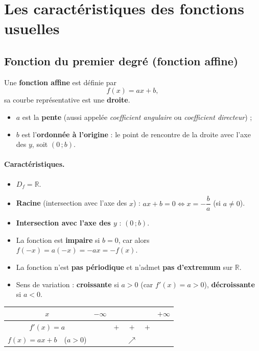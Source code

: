 \documentclass[11pt,a4paper]{article}
\newcommand{\R}{\mathbb{R}}
\newcommand{\Df}{D_f}
\newcommand{\croit}{\textcolor{varcol}{\Large$\nearrow$}}
\begin{document}
\section{Les caractéristiques des fonctions usuelles}

\subsection{Fonction du premier degré (fonction affine)}

\begin{definition}
Une \textbf{fonction affine} est définie par
\[
  f(x)=ax+b ,
\]
sa courbe représentative est une \textbf{droite}.
\begin{itemize}[leftmargin=1.5em,topsep=2pt]
  \item $a$ est la \textbf{pente} (aussi appelée \emph{coefficient angulaire} ou
        \emph{coefficient directeur}) ;
  \item $b$ est l'\textbf{ordonnée à l'origine} : le point de rencontre de la droite avec
        l'axe des $y$, soit $(0\,;b)$.
\end{itemize}
\end{definition}

\paragraph{Caractéristiques.}
\begin{itemize}[leftmargin=1.5em,topsep=2pt,itemsep=2pt]
  \item $\Df=\R$.
  \item \textbf{Racine} (intersection avec l'axe des $x$) : $ax+b=0 \Leftrightarrow x=-\dfrac{b}{a}$ (si $a\neq 0$).
  \item \textbf{Intersection avec l'axe des $y$} : $(0\,;b)$.
  \item La fonction est \textbf{impaire} si $b=0$, car alors $f(-x)=a(-x)=-ax=-f(x)$.
  \item La fonction n'est \textbf{pas périodique} et n'admet \textbf{pas d'extremum} sur $\R$.
  \item Sens de variation : \textbf{croissante} si $a>0$ (car $f'(x)=a>0$),
        \textbf{décroissante} si $a<0$.
\end{itemize}

\begin{center}
\renewcommand{\arraystretch}{1.6}\setlength{\tabcolsep}{12pt}
\begin{tabular}{|c|ccccc|}
\hline
\rowcolor{primarylight}
$x$ & $-\infty$ & & & & $+\infty$ \\
\hline
$f'(x)=a$ & & $+$ & $+$ & $+$ & \\
\hline
$f(x)=ax+b$\ \ ($a>0$) & & & \croit & & \\
\hline
\end{tabular}
\end{center}
\end{document}

